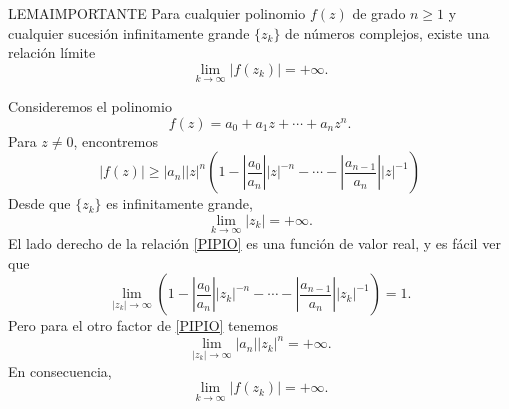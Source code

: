 \begin{lemma}{}{LEMAIMPORTANTE}
    Para cualquier polinomio $f(z)$ de grado $n \geq 1$ y cualquier sucesión infinitamente grande $\{z_k\}$ de números complejos, existe una relación límite
    $$\lim_{k \rightarrow \infty} |f(z_k)| = + \infty.$$

    \tcblower
    \demostracion Consideremos el polinomio
    $$f(z)=a_0+a_1z+ \cdots + a_nz^n.$$
    Para $z \neq 0$, encontremos
    \begin{equation}
        |f(z)| \geq |a_n||z|^n \left( 1- \left| \frac{a_0}{a_n} \right| |z|^{-n}- \cdots - \left| \frac{a_{n-1}}{a_n} \right| |z|^{-1} \right) \label{PIPIO}
    \end{equation}
    Desde que $\{z_k\}$ es infinitamente grande,
    $$\lim_{k \rightarrow \infty} |z_k|=+\infty.$$
    El lado derecho de la relación \eqref{PIPIO} es una función de valor real, y es fácil ver que
    $$\lim_{|z_k| \rightarrow \infty} \left( 1- \left| \frac{a_0}{a_n} \right| |z_k|^{-n}- \cdots - \left| \frac{a_{n-1}}{a_n} \right| |z_k|^{-1} \right) =1.$$
    Pero para el otro factor de \eqref{PIPIO} tenemos
    $$\lim_{|z_k| \rightarrow \infty} |a_n| |z_k|^n=+\infty.$$
    En consecuencia,
    $$\lim_{k \rightarrow \infty} |f(z_k)| = + \infty.$$
\end{lemma}

\newpage

